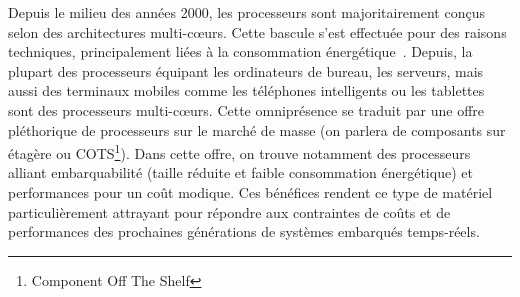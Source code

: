 




Depuis le milieu des années 2000, les processeurs sont majoritairement conçus selon des architectures multi-cœurs.
Cette bascule s'est effectuée pour des raisons techniques, principalement liées à la consommation énergétique~\cite{borkar1999design}.
Depuis, la plupart des processeurs équipant les ordinateurs de bureau, les serveurs, mais aussi des terminaux mobiles comme les téléphones intelligents ou les tablettes sont des processeurs multi-cœurs.
Cette omniprésence se traduit par une offre pléthorique de processeurs sur le marché de masse (on parlera de composants sur étagère ou COTS\footnote{Component Off The Shelf}).
Dans cette offre, on trouve notamment des processeurs alliant embarquabilité (taille réduite et faible consommation énergétique) et performances pour un coût modique.
Ces bénéfices rendent ce type de matériel particulièrement attrayant pour 
répondre aux contraintes de coûts et de performances des prochaines générations de systèmes embarqués temps-réels.

